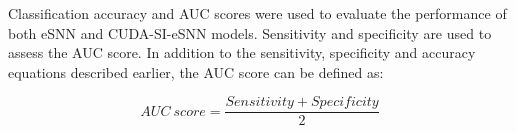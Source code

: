 Classification accuracy and AUC scores were used to evaluate the performance of both eSNN and CUDA-SI-eSNN models. Sensitivity and specificity are used to assess the AUC score. In addition to the sensitivity, specificity and accuracy equations described earlier, the AUC score can be defined as:

\begin{equation}
AUC\ score=\frac{Sensitivity+Specificity}{2}
\end{equation}





\begin{table}
	\centering
	\caption{Accuracy and AUC of CUDA-eSNN model with Gaussian Distribution for different stock indices.}
	\label{tab:accuracy}
\end{table}
